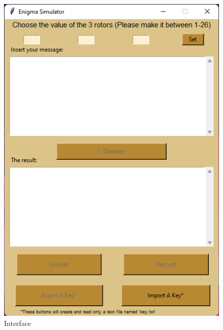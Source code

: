 \documentclass[conference,compsoc]{IEEEtran}
\begin{document}
\begin{figure}[h!]
    \centering
    \includegraphics[scale = 0.9]{interface.png}
    \caption{Interface}
    \label{fig:infac}
\end{figure}
\end{document}
